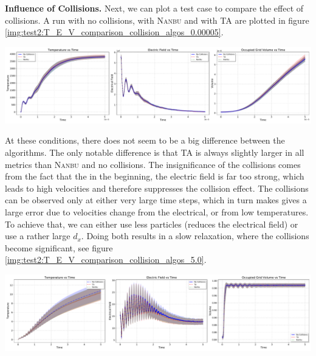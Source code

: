 \textbf{Influence of Collisions.} Next, we can plot a test case to compare the effect of collisions. A run with no collisions, with \textsc{Nanbu} and with TA are plotted in figure \ref{img:test2:T_E_V_comparison_collision_algos_0.00005}. \\
\begin{minipage}[h]{\linewidth}
    \vspace{5pt}
    \centering
    \includegraphics[width=\linewidth]{ressources/test2/T_E_V_comparison_collision_algos_0.00005.pdf}
    \label{img:test2:T_E_V_comparison_collision_algos_0.00005}
    \vspace{5pt}
\end{minipage}
At these conditions, there does not seem to be a big difference between the algorithms. The only notable difference is that TA is always slightly larger in all metrics than \textsc{Nanbu} and no collisions. The insignificance of the collisions comes from the fact that the in the beginning, the electric field is far too strong, which leads to high velocities and therefore suppresses the collision effect. The collisions can be observed only at either very large time steps, which in turn makes gives a large error due to velocities change from the electrical, or from low temperatures. To achieve that, we can either use less particles (reduces the electrical field) or use a rather large $d_x$. Doing both results in a slow relaxation, where the collisions become significant, see figure \ref{img:test2:T_E_V_comparison_collision_algos_5.0}. \\
\begin{minipage}[h]{\linewidth}
    \vspace{5pt}
    \centering
    \includegraphics[width=\linewidth]{ressources/test2/T_E_V_comparison_collision_algos_5.0.pdf}
    \label{img:test2:T_E_V_comparison_collision_algos_5.0}
    \vspace{5pt}
\end{minipage}

